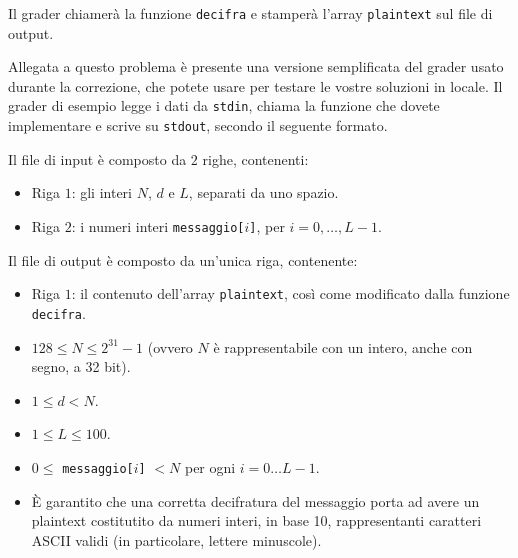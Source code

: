 Il grader chiamerà la funzione \texttt{decifra} e stamperà l'array \texttt{plaintext} sul file di output.



\Grader
Allegata a questo problema è presente una versione semplificata del grader usato durante la correzione, che potete usare per testare le vostre soluzioni in locale. Il grader di esempio legge i dati da \texttt{stdin}, chiama la funzione che dovete implementare e scrive su \texttt{stdout}, secondo il seguente formato.

Il file di input è composto da $2$ righe, contenenti:
\begin{itemize}[nolistsep,itemsep=2mm]
    \item Riga $1$: gli interi $N$, $d$ e $L$, separati da uno spazio.
    \item Riga $2$: i numeri interi \texttt{messaggio[$i$]}, per $i = 0,\ldots, L-1$.
\end{itemize}

Il file di output è composto da un'unica riga, contenente:
\begin{itemize}[nolistsep,itemsep=2mm]
    \item Riga $1$: il contenuto dell'array \texttt{plaintext}, così come modificato dalla funzione \texttt{decifra}.
\end{itemize}


\Constraints

\begin{itemize}[nolistsep, itemsep=2mm]
\item $128 \le N \le 2^{31} - 1$ (ovvero $N$ è rappresentabile con un intero, anche con segno, a 32 bit).
\item $1 \le d < N$.
\item $1 \le L \le 100$.
\item $0 \le $ \texttt{messaggio[$i$]} $ < N$ per ogni $i=0\ldots L-1$.
\item È garantito che una corretta decifratura del messaggio porta ad avere un plaintext costitutito da numeri interi, in base 10, rappresentanti caratteri ASCII validi (in particolare, lettere minuscole).
\end{itemize}

